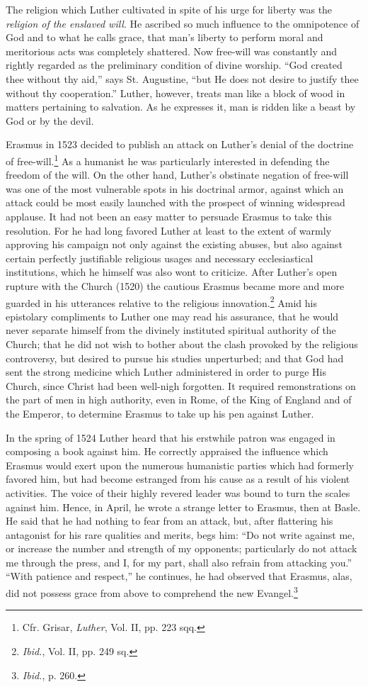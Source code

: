 The religion which Luther cultivated in spite of his urge for
liberty was the \textit{religion of the enslaved will}. He ascribed so much
influence to the omnipotence of God and to what he calls grace,
that man’s liberty to perform moral and meritorious acts was completely
shattered. Now free-will was constantly and rightly regarded
as the preliminary condition of divine worship. “God created thee
without thy aid,” says St. Augustine, “but He does not desire to
justify thee without thy cooperation.” Luther, however, treats
man like a block of wood in matters pertaining to salvation. As
he expresses it, man is ridden like a beast by God or by the devil.

Erasmus in 1523 decided to publish an attack on Luther’s denial
of the doctrine of free-will.\footnote{Cfr. Grisar, \textit{Luther}, Vol. II, pp. 223 sqq.}
As a humanist he was particularly
interested in defending the freedom of the will. On the other hand,
Luther’s obstinate negation of free-will was one of the most vulnerable
spots in his doctrinal armor, against which an attack could
be most easily launched with the prospect of winning widespread
applause. It had not been an easy matter to persuade Erasmus to
take this resolution. For he had long favored Luther at least to the
extent of warmly approving his campaign not only against the
existing abuses, but also against certain perfectly justifiable religious
usages and necessary ecclesiastical institutions, which he himself
was also wont to criticize. After Luther’s open rupture with the
Church (1520) the cautious Erasmus became more and more guarded
in his utterances relative to the religious innovation.\footnote
{\textit{Ibid.}, Vol. II, pp. 249 sq.}
Amid his
epistolary compliments to Luther one may read his assurance, that
he would never separate himself from the divinely instituted spiritual
authority of the Church; that he did not wish to bother about
the clash provoked by the religious controversy, but desired to pursue
his studies unperturbed; and that God had sent the strong medicine
which Luther administered in order to purge His Church, since
Christ had been well-nigh forgotten. It required remonstrations on
the part of men in high authority, even in Rome, of the King of
England and of the Emperor, to determine Erasmus to take up his
pen against Luther.

In the spring of 1524 Luther heard that his erstwhile patron was
engaged in composing a book against him. He correctly appraised
the influence which Erasmus would exert upon the numerous humanistic
parties which had formerly favored him, but had become
estranged from his cause as a result of his violent activities. The
voice of their highly revered leader was bound to turn the scales
against him. Hence, in April, he wrote a strange letter to Erasmus,
then at Basle. He said that he had nothing to fear from an attack, but,
after flattering his antagonist for his rare qualities and merits, begs
him: “Do not write against me, or increase the number and strength
of my opponents; particularly do not attack me through the press,
and I, for my part, shall also refrain from attacking you.” “With patience
and respect,” he continues, he had observed that Erasmus, alas,
did not possess grace from above to comprehend the new Evangel.\footnote{\textit{Ibid.}, p. 260.}

